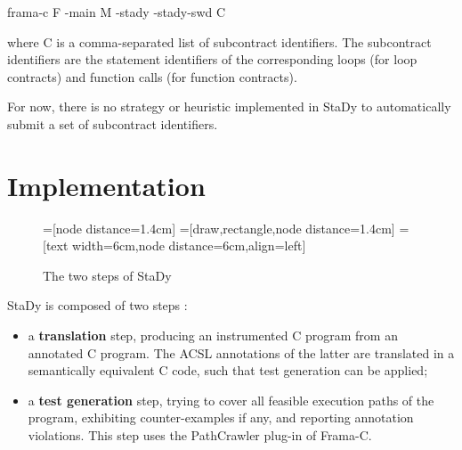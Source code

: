 \documentclass[web]{frama-c-book}
\begin{document}
\begin{shell}
  frama-c F -main M -stady -stady-swd C
\end{shell}

where C is a comma-separated list of subcontract identifiers. The subcontract identifiers are the statement identifiers of the corresponding loops (for loop contracts) and function calls (for function contracts).

For now, there is no strategy or heuristic implemented in StaDy to automatically submit a set of subcontract identifiers.


\chapter{Implementation}


\begin{figure}\centering
  =[node distance=1.4cm]
  =[draw,rectangle,node distance=1.4cm]
  =[text width=6cm,node distance=6cm,align=left]
  \caption{The two steps of StaDy\label{fig:stady-steps}}
\end{figure}

StaDy is composed of two steps :
\begin{itemize}
\item a \textbf{translation} step, producing an instrumented C program from an annotated C program. The ACSL annotations of the latter are translated in a semantically equivalent C code, such that test generation can be applied;

\item a \textbf{test generation} step, trying to cover all feasible execution paths of the program, exhibiting counter-examples if any, and reporting annotation violations. This step uses the PathCrawler plug-in of Frama-C.
\end{itemize}
\end{document}
